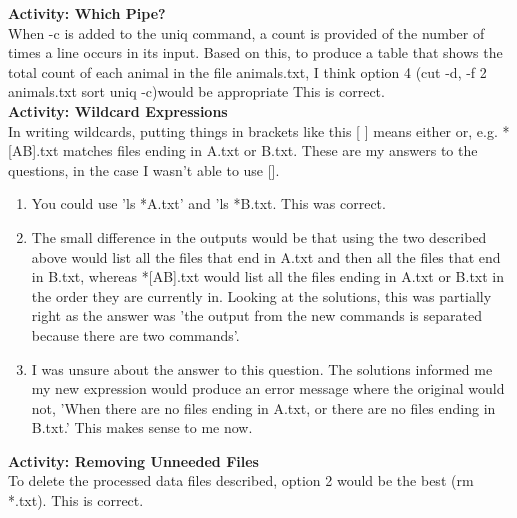 \documentclass{article}
\begin{document}
\begin{FlushLeft}
\textbf{Activity: Which Pipe?}\\
When -c is added to the uniq command, a count is provided of the number of times a line occurs in its input. Based on this, to produce a table that shows the total count of each animal in the file animals.txt, I think option 4 (cut -d, -f 2 animals.txt \textbar{} sort \textbar{} uniq -c)would be appropriate This is correct.\\
\vspace{5mm}
\textbf{Activity: Wildcard Expressions}\\
In writing wildcards, putting things in brackets like this [ ] means either or, e.g. *[AB].txt matches files ending in A.txt or B.txt. These are my answers to the questions, in the case I wasn't able to use [].
\begin{enumerate}
    \item You could use 'ls *A.txt' and 'ls *B.txt. This was correct.
    \item The small difference in the outputs would be that using the two described above would list all the files that end in A.txt and then all the files that end in B.txt, whereas *[AB].txt would list all the files ending in A.txt or B.txt in the order they are currently in. Looking at the solutions, this was partially right as the answer was 'the output from the new commands is separated because there are two commands'.
    \item I was unsure about the answer to this question. The solutions informed me my new expression would produce an error message where the original would not, 'When there are no files ending in A.txt, or there are no files ending in B.txt.' This makes sense to me now.
\end{enumerate}
\vspace{5mm}
\textbf{Activity: Removing Unneeded Files}\\
To delete the processed data files described, option 2 would be the best (rm *.txt). This is correct.\\


\end{FlushLeft}
\end{document}
